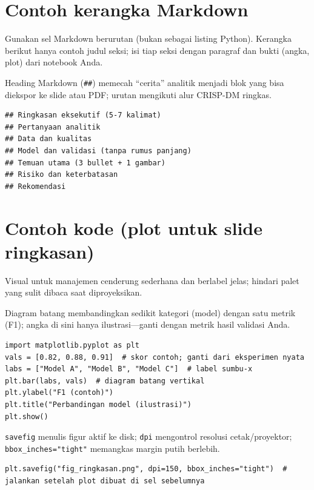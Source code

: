 \documentclass[../main.tex]{subfiles}
\begin{document}
\section{Contoh kerangka Markdown}

Gunakan sel Markdown berurutan (bukan sebagai listing Python). Kerangka berikut hanya contoh judul seksi; isi tiap seksi dengan paragraf dan bukti (angka, plot) dari notebook Anda.

\MulaiPenjelasanKode Heading Markdown (\texttt{\#\#}) memecah ``cerita'' analitik menjadi blok yang bisa diekspor ke slide atau PDF; urutan mengikuti alur CRISP-DM ringkas. \SelesaiPenjelasanKode

\begin{verbatim}
## Ringkasan eksekutif (5-7 kalimat)
## Pertanyaan analitik
## Data dan kualitas
## Model dan validasi (tanpa rumus panjang)
## Temuan utama (3 bullet + 1 gambar)
## Risiko dan keterbatasan
## Rekomendasi
\end{verbatim}

\section{Contoh kode (plot untuk slide ringkasan)}

Visual untuk manajemen cenderung sederhana dan berlabel jelas; hindari palet yang sulit dibaca saat diproyeksikan.

\MulaiPenjelasanKode Diagram batang membandingkan sedikit kategori (model) dengan satu metrik (F1); angka di sini hanya ilustrasi---ganti dengan metrik hasil validasi Anda. \SelesaiPenjelasanKode

\begin{lstlisting}[caption=Plot sederhana untuk disematkan di narasi]
import matplotlib.pyplot as plt
vals = [0.82, 0.88, 0.91]  # skor contoh; ganti dari eksperimen nyata
labs = ["Model A", "Model B", "Model C"]  # label sumbu-x
plt.bar(labs, vals)  # diagram batang vertikal
plt.ylabel("F1 (contoh)")
plt.title("Perbandingan model (ilustrasi)")
plt.show()
\end{lstlisting}

\MulaiPenjelasanKode \texttt{savefig} menulis figur aktif ke disk; \texttt{dpi} mengontrol resolusi cetak/proyektor; \texttt{bbox\_inches="tight"} memangkas margin putih berlebih. \SelesaiPenjelasanKode

\begin{lstlisting}[caption=Export figur ke berkas]
plt.savefig("fig_ringkasan.png", dpi=150, bbox_inches="tight")  # jalankan setelah plot dibuat di sel sebelumnya
\end{lstlisting}
\end{document}

